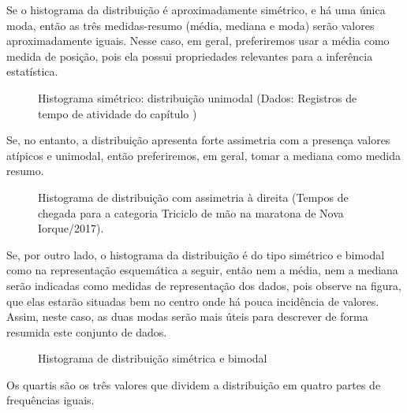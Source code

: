 Se o histograma da distribuição é aproximadamente simétrico, e há uma única moda, então as três medidas-resumo (média, mediana e moda) serão valores aproximadamente iguais. Nesse caso, em geral, preferiremos usar a média como medida de posição, pois ela possui propriedades relevantes para a inferência estatística.

\begin{figure}[H]
\centering
\capstart

\noindent{}
\caption{Histograma simétrico: distribuição unimodal (Dados: Registros de tempo de atividade do capítulo )}\label{\detokenize{PE104-1:id4}}\label{\detokenize{PE104-1:id18}}\end{figure}

Se, no entanto, a distribuição apresenta forte assimetria com a presença valores atípicos e unimodal, então preferiremos, em geral, tomar a mediana como medida resumo.

\begin{figure}[H]
\centering
\capstart

\noindent{}
\caption{Histograma de distribuição com assimetria à direita (Tempos de chegada para a categoria Triciclo de mão na maratona de Nova Iorque/2017).}\label{\detokenize{PE104-1:fig-assimetriadireita}}\label{\detokenize{PE104-1:id19}}\end{figure}

Se, por outro lado, o histograma da distribuição é do tipo simétrico e bimodal como na representação esquemática a seguir, então nem a média, nem a mediana serão indicadas como medidas de representação dos dados, pois observe na figura, que elas estarão situadas bem no centro onde há pouca incidência de valores. Assim, neste caso, as duas modas serão mais úteis para descrever de forma resumida este conjunto de dados.

\begin{figure}[H]
\centering
\capstart

\noindent{}
\caption{Histograma de distribuição simétrica e bimodal}\label{\detokenize{PE104-1:id5}}\label{\detokenize{PE104-1:id20}}\end{figure}


Os quartis são os três valores que dividem a distribuição em quatro partes de frequências iguais.

